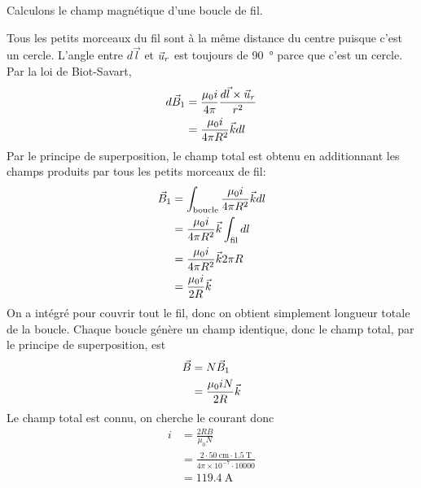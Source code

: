 \begin{reponsebox}
  Calculons le champ magnétique d'une boucle de fil.

  Tous les petits morceaux du fil sont à la même distance du centre puisque c'est
  un cercle. L'angle entre $d\vec{l}$ et $\vec{u}_r$ est toujours de
  \SI{90}{\degree} parce que c'est un cercle. Par la loi de Biot-Savart,
  \begin{align*}
    d\vec{B}_1 &= \frac{\mu_0 i}{4\pi} \frac{d\vec{l} \times \vec{u}_r}{r^2} \\
         &= \frac{\mu_0 i}{4\pi R^2} \vec{k} dl
  \end{align*}
  Par le principe de superposition, le champ total est obtenu en additionnant
  les champs produits par tous les petits morceaux de fil:
  \begin{align*}
    \vec{B}_1 &= \int_\mathrm{boucle} \frac{\mu_0 i}{4\pi R^2}\vec{k} dl  \\
        &= \frac{\mu_0 i}{4\pi R^2}\vec{k} \int_\mathrm{fil} dl  \\
        &= \frac{\mu_0 i}{4\pi R^2}\vec{k} 2\pi R  \\
        &= \frac{\mu_0 i}{2 R}\vec{k}
  \end{align*}
  On a intégré pour couvrir tout le fil, donc on obtient simplement longueur
  totale de la boucle. Chaque boucle génère un champ identique, donc le champ
  total, par le principe de superposition, est
  \begin{align*}
    \vec{B} &= N\vec{B}_1 \\
        &= \frac{\mu_0 i N}{2 R}\vec{k}
  \end{align*}
  Le champ total est connu, on cherche le courant donc
  \begin{align*}
    i &= \frac{2R B}{\mu_0 N}  \\
      &= \frac{2 \cdot \SI{50}{\centi\meter} \cdot \SI{1.5}{\tesla}}{4\pi
        \times 10^{-7} \cdot \num{10000}}  \\
      &= \SI{119.4}{\ampere}
  \end{align*}


\end{reponsebox}
